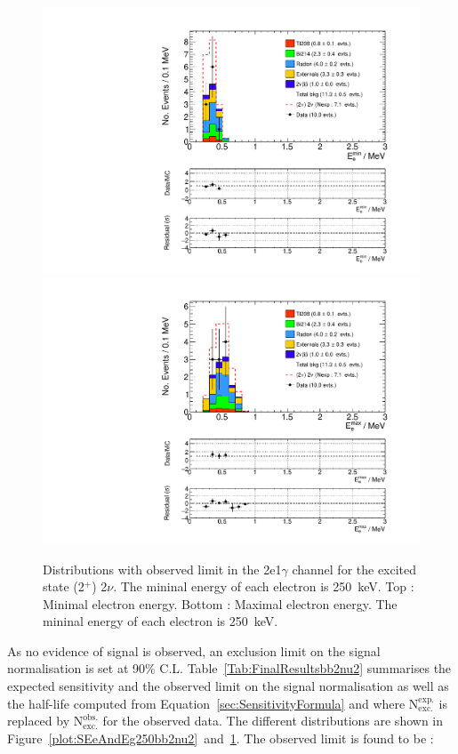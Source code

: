 \documentclass[main.tex]{subfiles}
\begin{document}
\begin{figure} [h!]
\begin{center}
\includegraphics[scale=0.5]{pictures/FinalResults/bb2nu2/250/Eemin_bb2nu2.pdf}
\includegraphics[scale=0.5]{pictures/FinalResults/bb2nu2/250/Eemax_bb2nu2.pdf}
\end{center}
\caption{Distributions with observed limit in the 2e1$\gamma$ channel for the excited state (2$^+$) 2$\nu$. The mininal energy of each electron is 250~keV. Top : Minimal electron energy. Bottom : Maximal electron energy. The mininal energy of each electron is 250~keV.}
\label{plot:EeminAndEemax250bb2nu2}
\end{figure}


\NI As no evidence of signal is observed, an exclusion limit on the signal normalisation is set at 90\% C.L. Table~\ref{Tab:FinalResultsbb2nu2} summarises the expected sensitivity and the observed limit on the signal normalisation as well as the half-life computed from Equation~\ref{sec:SensitivityFormula} and where $\text{N}_{\text{exc.}}^{\text{exp.}}$ is replaced by $\text{N}_{\text{exc.}}^{\text{obs.}}$ for the observed data. The different distributions are shown in Figure~\ref{plot:SEeAndEg250bb2nu2}~and~\ref{plot:EeminAndEemax250bb2nu2}. The observed limit is found to be :
\end{document}
